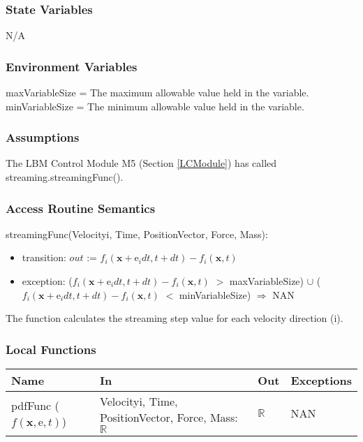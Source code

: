 \documentclass[12pt, titlepage]{article}
\begin{document}
\subsubsection{State Variables}

N/A

\subsubsection{Environment Variables}
maxVariableSize = The maximum allowable value held in the variable.\\
minVariableSize = The minimum allowable value held in the variable.

\subsubsection{Assumptions}

The LBM Control Module M5 (Section \ref{LCModule}) has called streaming.streamingFunc().

\subsubsection{Access Routine Semantics}

\noindent streamingFunc(Velocityi, Time, PositionVector, Force, Mass):
\begin{itemize}
	\item transition: $out$ := $f_i(\mathrm{\textbf{x}} +\mathrm{e}_i dt, t + dt) - f_i(\mathrm{\textbf{x}},t)$
	\item exception: ($f_i(\mathrm{\textbf{x}} +\mathrm{e}_i dt, t + dt) - f_i(\mathrm{\textbf{x}},t)$ $>$ maxVariableSize) $\cup$ ($f_i(\mathrm{\textbf{x}} +\mathrm{e}_i dt, t + dt) - f_i(\mathrm{\textbf{x}},t)$ $<$ minVariableSize) $\Rightarrow$ NAN
\end{itemize}

The function calculates the streaming step value for each velocity direction (i).

\subsubsection{Local Functions}

\begin{center}
	\begin{tabular}{p{2cm} p{3cm} p{4cm} p{2cm}}
		\hline
		\textbf{Name} & \textbf{In} & \textbf{Out} & \textbf{Exceptions} \\
		\hline
		pdfFunc ($f(\mathrm{\textbf{x}},\mathrm{e},t)$) & Velocityi, Time, PositionVector, Force, Mass: $\mathbb{R}$ & $\mathbb{R}$ & NAN \\
		\hline
	\end{tabular}
\end{center}
\end{document}
